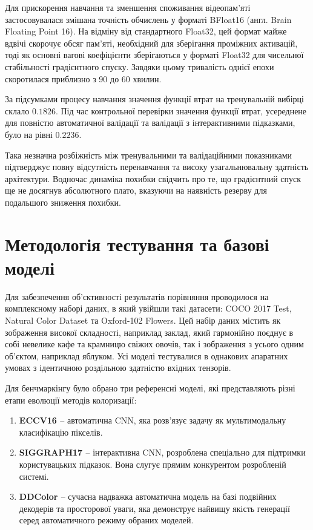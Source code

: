         Для прискорення навчання та зменшення споживання відеопам'яті застосовувалася змішана точність обчислень у форматі BFloat16 (англ. Brain Floating Point 16).
        На відміну від стандартного Float32, цей формат майже вдвічі скорочує обсяг пам'яті, необхідний для зберігання проміжних активацій, тоді як основні вагові коефіцієнти зберігаються у форматі Float32 для чисельної стабільності градієнтного спуску. Завдяки цьому тривалість однієї епохи скоротилася приблизно з 90 до 60 хвилин.

        За підсумками процесу навчання значення функції втрат на тренувальній вибірці склало $0.1826$.
        Під час контрольної перевірки значення функції втрат, усереднене для повністю автоматичної валідації та валідації з інтерактивними підказками, було на рівні $0.2236$.

        Така незначна розбіжність між тренувальними та валідаційними показниками підтверджує повну відсутність перенавчання та високу узагальнювальну здатність архітектури.
        Водночас динаміка похибки свідчить про те, що градієнтний спуск ще не досягнув абсолютного плато, вказуючи на наявність резерву для подальшого зниження похибки.

    \section{Методологія тестування та базові моделі}

        Для забезпечення об'єктивності результатів порівняння проводилося на комплексному наборі даних,
        в який увійшли такі датасети: COCO 2017 Test, Natural Color Dataset та Oxford-102 Flowers.
        Цей набір даних містить як зображення високої складності, наприклад заклад, який гармонійно поєднує в собі невелике кафе та крамницю свіжих овочів,
        так і зображення з усього одним об'єктом, наприклад яблуком.
        Усі моделі тестувалися в однакових апаратних умовах з ідентичною роздільною здатністю вхідних тензорів.

        Для бенчмаркінгу було обрано три референсні моделі, які представляють різні етапи еволюції методів колоризації:
        \begin{enumerate}
            \item \textbf{ECCV16 \cite{2016-colorful-image-colorization}} -- автоматична CNN, яка розв'язує задачу як мультимодальну класифікацію пікселів.
            \item \textbf{SIGGRAPH17 \cite{2017-real-time-user-guided-image-colorization}} -- інтерактивна CNN, розроблена спеціально для підтримки користувацьких підказок.
                Вона слугує прямим конкурентом розробленій системі.
            \item \textbf{DDColor \cite{2023-ddcolor}} -- сучасна надважка автоматична модель на базі подвійних декодерів та просторової уваги,
                яка демонструє найвищу якість генерації серед автоматичного режиму обраних моделей.
        \end{enumerate}

